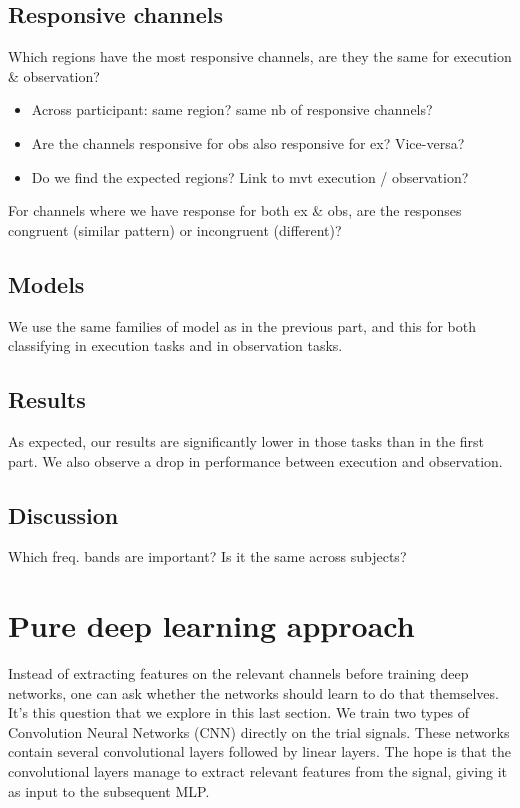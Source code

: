 \documentclass[10pt,conference,compsocconf]{IEEEtran}
\begin{document}
\subsection{Responsive channels}
Which regions have the most responsive channels, are they the same for execution \& observation?

\begin{itemize}
    \item Across participant: same region? same nb of responsive channels?
    \item Are the channels responsive for obs also responsive for ex? Vice-versa?
    \item Do we find the expected regions? Link to mvt execution / observation?
\end{itemize}

For channels where we have response for both ex \& obs, are the responses congruent (similar pattern) or incongruent (different)?

\subsection{Models}
We use the same families of model as in the previous part, and this for both classifying in execution tasks and in observation tasks.

\subsection{Results}
As expected, our results are significantly lower in those tasks than in the first part. We also observe a drop in performance between execution and observation.

\subsection{Discussion}
Which freq. bands are important? Is it the same across subjects?

\section{Pure deep learning approach}
\label{sec:deeplearning}
Instead of extracting features on the relevant channels before training deep networks, one can ask whether the networks should learn to do that themselves. It's this question that we explore in this last section. We train two types of Convolution Neural Networks (CNN) directly on the trial signals. These networks contain several convolutional layers followed by linear layers. The hope is that the convolutional layers manage to extract relevant features from the signal, giving it as input to the subsequent MLP.
\end{document}
